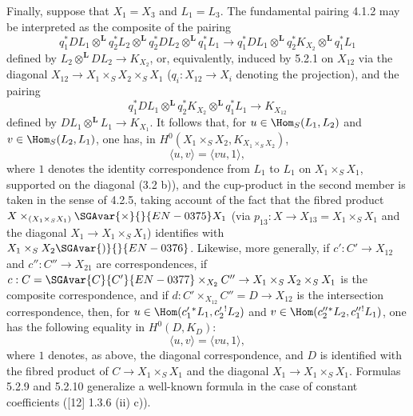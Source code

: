 Finally, suppose that $X_1=X_3$ and $L_1=L_3$. The fundamental pairing 4.1.2 may be interpreted as the composite of the pairing
\begin{equation}
\tag{5.2.7}
q_1^*DL_1\otimes^{\mathbf L}q_2^*L_2\otimes^{\mathbf L}q_2^*DL_2\otimes^{\mathbf L}q_1^*L_1
\longrightarrow
q_1^*DL_1\otimes^{\mathbf L}q_2^*K_{X_2}\otimes^{\mathbf L}q_1^*L_1
\end{equation}
defined by $L_2\otimes^{\mathbf L}DL_2\to K_{X_2}$, or, equivalently, induced by 5.2.1 on $X_{12}$ via the diagonal $X_{12}\to X_1\times_SX_2\times_SX_1$ ($q_i:X_{12}\to X_i$ denoting the projection), and the pairing
\begin{equation}
\tag{5.2.8}
q_1^*DL_1\otimes^{\mathbf L}q_2^*K_{X_2}\otimes^{\mathbf L}q_1^*L_1\longrightarrow K_{X_{12}}
\end{equation}
defined by $DL_1\otimes^{\mathbf L}L_1\to K_{X_1}$. It follows that, for $u\in\Hom_S(L_1,L_2)$ and $v\in\Hom_S(L_2,L_1)$, one has, in $H^0(X_1\times_SX_2,K_{X_1\times_SX_2})$,
\begin{equation}
\tag{5.2.9}
\langle u,v\rangle=\langle vu,1\rangle,
\end{equation}
where $1$ denotes the identity correspondence from $L_1$ to $L_1$ on $X_1\times_SX_1$, supported on the diagonal (3.2 b)), and the cup-product in the second member is taken in the sense of 4.2.5, taking account of the fact that the fibred product $X\times_{(X_1\times_SX_1)}\SGAvar{\times }{}{EN-0375}X_1$ (via $p_{13}:X\to X_{13}=X_1\times_SX_1$ and the diagonal $X_1\to X_1\times_SX_1$) identifies with $X_1\times_SX_2\SGAvar{)}{}{EN-0376}$. Likewise, more generally, if $c':C'\to X_{12}$ and $c'':C''\to X_{21}$ are correspondences, if $c:C=\SGAvar{C}{C'}{EN-0377}\times_{X_2}C''\to X_1\times_SX_2\times_SX_1$ is the composite correspondence, and if $d:C'\times_{X_{12}}C''=D\to X_{12}$ is the intersection correspondence, then, for $u\in\Hom(c_1'{}^*L_1,c_2'{}^!L_2)$ and $v\in\Hom(c_2''{}^*L_2,c_1''{}^!L_1)$, one has the following equality in $H^0(D,K_D)$:
\begin{equation}
\tag{5.2.10}
\langle u,v\rangle=\langle vu,1\rangle,
\end{equation}
where $1$ denotes, as above, the diagonal correspondence, and $D$ is identified with the fibred product of $C\to X_1\times_SX_1$ and the diagonal $X_1\to X_1\times_SX_1$. Formulas 5.2.9 and 5.2.10 generalize a well-known formula in the case of constant coefficients ([12] 1.3.6 (ii) c)).

